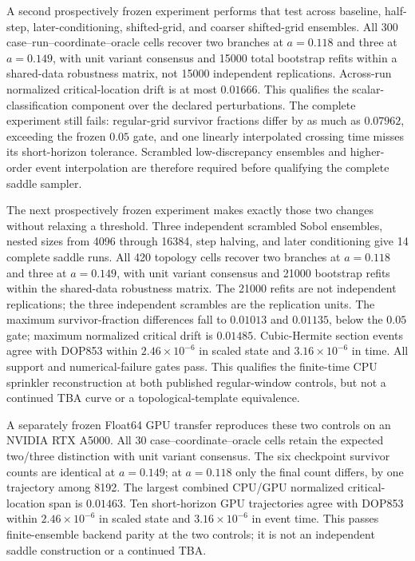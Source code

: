 A second prospectively frozen experiment performs that test across baseline,
half-step, later-conditioning, shifted-grid, and coarser shifted-grid
ensembles.  All 300 case--run--coordinate--oracle cells recover two branches at
$a=0.118$ and three at $a=0.149$, with unit variant consensus and 15000 total
bootstrap refits within a shared-data robustness matrix, not 15000 independent
replications. Across-run normalized critical-location drift is at most
$0.01666$. This qualifies the scalar-classification component over the declared
perturbations.  The complete experiment still fails: regular-grid survivor
fractions differ by as much as $0.07962$, exceeding the frozen $0.05$ gate,
and one linearly interpolated crossing time misses its short-horizon tolerance.
Scrambled low-discrepancy ensembles and higher-order event interpolation are
therefore required before qualifying the complete saddle sampler.

The next prospectively frozen experiment makes exactly those two changes
without relaxing a threshold.  Three independent scrambled Sobol ensembles,
nested sizes from 4096 through 16384, step halving, and later conditioning give
14 complete saddle runs.  All 420 topology cells recover two branches at
$a=0.118$ and three at $a=0.149$, with unit variant consensus and 21000
bootstrap refits within the shared-data robustness matrix. The 21000 refits
are not independent replications; the three independent scrambles are the
replication units. The maximum survivor-fraction differences fall to $0.01013$
and $0.01135$, below the $0.05$ gate; maximum normalized critical drift is
$0.01485$.  Cubic-Hermite section events agree with DOP853 within
$2.46\times10^{-6}$ in scaled state and $3.16\times10^{-6}$ in time.  All
support and numerical-failure gates pass.  This qualifies the finite-time CPU
sprinkler reconstruction at both published regular-window controls, but not a
continued TBA curve or a topological-template equivalence.

A separately frozen Float64 GPU transfer reproduces these two controls on an
NVIDIA RTX A5000.  All 30 case--coordinate--oracle cells retain the expected
two/three distinction with unit variant consensus.  The six checkpoint
survivor counts are identical at $a=0.149$; at $a=0.118$ only the final count
differs, by one trajectory among 8192.  The largest combined CPU/GPU normalized
critical-location span is $0.01463$.  Ten short-horizon GPU trajectories agree
with DOP853 within $2.46\times10^{-6}$ in scaled state and
$3.16\times10^{-6}$ in event time. This passes finite-ensemble backend parity at
the two controls; it is not an independent saddle construction or a continued
TBA.


